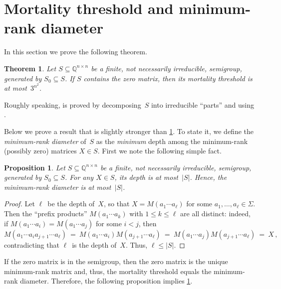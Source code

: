 \documentclass{lmcs}
\newtheorem{theorem}[thm]{Theorem}
\newtheorem{proposition}[thm]{Proposition}
\theoremstyle{definition}
\newcommand{\Q}{\mathbb{Q}}
\begin{document}
\section{Mortality threshold and minimum-rank diameter}\label{sec:mortality}
In this section we prove the following theorem.

\begin{theorem} \label{thm:min-rank-diameter}
Let $S \subseteq \Q^{n \times n}$ be a finite, not necessarily irreducible, semigroup, generated by $S_0 \subseteq S$.
If $S$ contains the zero matrix, then its mortality threshold is at most~$3^{n^2}$.
\end{theorem}

Roughly speaking,  is proved by decomposing~$S$ into irreducible ``parts'' and using .

Below we prove a result that is slightly stronger than \cref{thm:min-rank-diameter}.
To state it, we define the \emph{minimum-rank diameter} of~$S$ as the \emph{minimum} depth among the minimum-rank (possibly zero) matrices $X \in S$.
First we note the following simple fact.
\begin{proposition} \label{prop:diameter-size-bound}
Let $S \subseteq \Q^{n \times n}$ be a finite, not necessarily irreducible, semigroup, generated by $S_0 \subseteq S$.
For any $X \in S$, its depth is at most~$|S|$.
Hence, the minimum-rank diameter is at most~$|S|$.
\end{proposition}
\begin{proof}
Let $\ell$~be the depth of~$X$, so that $X = M(a_1 \cdots a_\ell)$ for some $a_1, \ldots, a_\ell \in \Sigma$.
Then the ``prefix products'' $M(a_1 \cdots a_k)$ with $1 \le k \le \ell$ are all distinct: indeed, if $M(a_1 \cdots a_i) = M(a_1 \cdots a_j)$ for some $i < j$, then
\[
 M(a_1 \cdots a_i a_{j+1} \cdots a_\ell) \ = \ M(a_1 \cdots a_i) M(a_{j+1} \cdots a_\ell) \ = \ M(a_1 \cdots a_j) M(a_{j+1} \cdots a_\ell) \ = \ X\,,
\]
contradicting that $\ell$~is the depth of~$X$.
Thus, $\ell \le |S|$.
\end{proof}

If the zero matrix is in the semigroup, then the zero matrix is the unique minimum-rank matrix and, thus, the mortality threshold equals the minimum-rank diameter.
Therefore, the following proposition implies \cref{thm:min-rank-diameter}.
\end{document}
